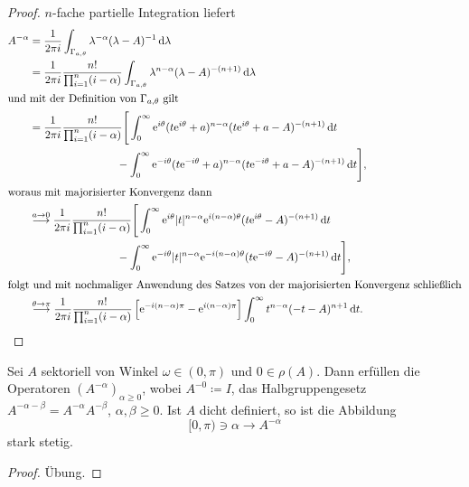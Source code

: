 \begin{proof}
  $n$-fache partielle Integration liefert
  \begin{align*}
    A^{-\alpha}
    &= \frac{1}{2\pi i} \int_{\Gamma_{a, \theta}} \lambda^{-\alpha} (\lambda - A)^{-1} \, {\operatorname{d}\!{\lambda}} \\
    &= \frac{1}{2\pi i} \frac{n!}{\prod_{i = 1}^n (i - \alpha)} \int_{\Gamma_{a , \theta}} \lambda^{n - \alpha} (\lambda - A)^{-(n+1)} \, {\operatorname{d}\!{\lambda}} \\
    \intertext{und mit der Definition von $\Gamma_{a,\theta}$ gilt}
    &= \frac{1}{2\pi i} \frac{n!}{\prod_{i = 1}^n ( i - \alpha )} \Bigg[ \int_0^\infty \mathrm{e}^{i\theta} (t \mathrm{e}^{i\theta} + a )^{n - \alpha} (t \mathrm{e}^{i\theta} + a - A)^{-(n+1)} \, {\operatorname{d}\!{t}}  \\
    &\quad\quad\quad\quad\quad\quad\quad\quad- \int_0^\infty \mathrm{e}^{-i\theta} (t \mathrm{e}^{-i\theta} + a)^{n - \alpha} (t \mathrm{e}^{-i\theta} + a - A)^{-(n + 1)} \, {\operatorname{d}\!{t}}\Bigg], \\
    \intertext{woraus mit majorisierter Konvergenz dann}
    &\overset{a \to 0}{\longrightarrow} \frac{1}{2\pi i} \frac{n!}{\prod_{i = 1}^n ( i - \alpha )} 
    \Bigg[ \int_0^\infty \mathrm{e}^{i\theta} |t|^{n - \alpha} \mathrm{e}^{i(n - \alpha)\theta} (t \mathrm{e}^{i\theta} - A)^{-(n+1)} \, {\operatorname{d}\!{t}}  \\
    &\quad\quad\quad\quad\quad\quad\quad\quad - \int_0^\infty \mathrm{e}^{-i\theta} |t|^{n - \alpha} \mathrm{e}^{-i(n - \alpha)\theta} (t \mathrm{e}^{-i\theta} - A)^{-(n + 1)} \, {\operatorname{d}\!{t}}\Bigg],\\
    \intertext{folgt und mit nochmaliger Anwendung des Satzes von der majorisierten Konvergenz schließlich}
    &\overset{\theta \to \pi}{\longrightarrow} \frac{1}{2\pi i} \frac{n!}{\prod_{i = 1}^n (i - \alpha)}
    \left[ \mathrm{e}^{-i (n - \alpha) \pi} - \mathrm{e}^{i (n - \alpha)\pi} \right] \int_0^\infty t^{n -\alpha} (-t - A)^{n + 1} \, {\operatorname{d}\!{t}}.
  \end{align*}
\end{proof}

\begin{thm}
  \label{thm:fracPowSemigroup}
  Sei $A$ sektoriell von Winkel $\omega \in (0,\pi)$ und $0 \in \rho(A)$.
  Dann erfüllen die Operatoren $(A^{-\alpha})_{\alpha \geq 0}$, wobei $A^{-0} \coloneqq I$, das Halbgruppengesetz $A^{-\alpha - \beta} = A^{-\alpha} A^{-\beta}$, $\alpha,\beta \geq 0$.
  Ist $A$ dicht definiert, so ist die Abbildung
  $$
  [0,\pi) \ni \alpha \to A^{-\alpha}
  $$
  stark stetig.
\end{thm}

\begin{proof}
  Übung.
\end{proof}

